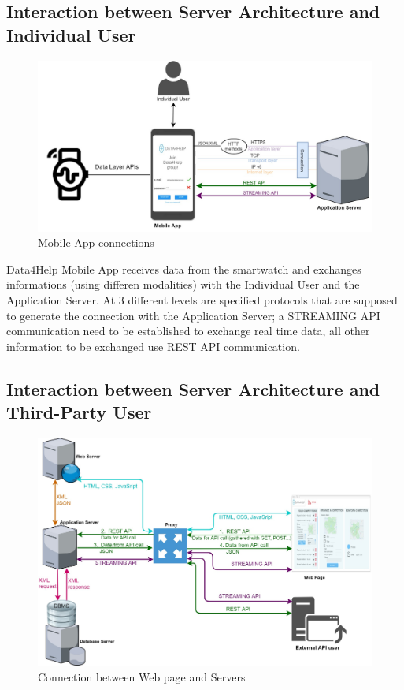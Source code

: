 \subsection{Interaction between Server Architecture and Individual User}
\begin{figure}[H]
\caption{Mobile App connections}
\includegraphics[width = \textwidth]{sections/architecturalDesign/overview_individual_user.jpg}
\end{figure}

Data4Help Mobile App receives data from the smartwatch and exchanges informations (using differen modalities) with the Individual User and the Application Server. 
At 3 different levels are specified protocols that are supposed to generate the connection with the Application Server; a STREAMING API communication need to be established to exchange real time data, all other information to be exchanged use REST API communication. 
 

\subsection{Interaction between Server Architecture and Third-Party User}
\begin{figure}[H]
\caption{Connection between Web page and Servers}
\includegraphics[width = \textwidth]{sections/architecturalDesign/overview_web.jpg}
\end{figure}

